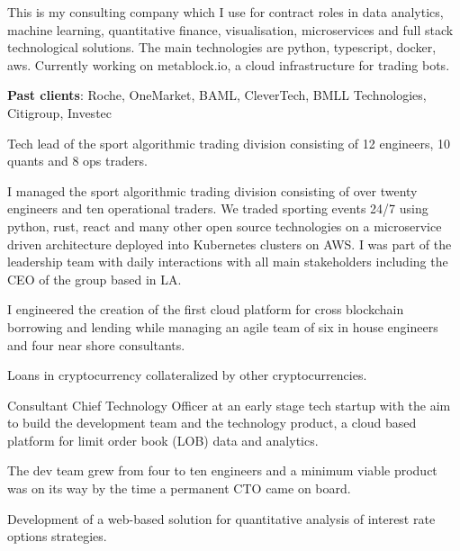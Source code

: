
This is my consulting company which I use for contract roles in data analytics, machine learning, quantitative finance,
visualisation, microservices and full stack technological solutions. The main technologies are python, typescript, docker, aws.
Currently working on \textcolor{sectcol}{metablock.io}, a cloud infrastructure for trading bots.

{\bf Past clients}: Roche, OneMarket, BAML, CleverTech, BMLL Technologies, Citigroup, Investec



Tech lead of the sport algorithmic trading division consisting of 12 engineers, 10 quants and 8 ops traders.

I managed the sport algorithmic trading division consisting of over twenty engineers and ten operational traders.
We traded sporting events 24/7 using python, rust, react and many other open source technologies on a
microservice driven architecture deployed into Kubernetes clusters on AWS.
I was part of the leadership team with daily interactions with all main stakeholders including
the CEO of the group based in LA.



I engineered the creation of the first cloud platform for cross blockchain borrowing and lending
while managing an agile team of six in house engineers and four near shore consultants.

Loans in cryptocurrency collateralized by other cryptocurrencies.



Consultant Chief Technology Officer at an early stage tech startup with the aim to build the development team and the technology product,
a cloud based platform for limit order book (LOB) data and analytics.

The dev team grew from four to ten engineers and a minimum viable product was on its way by the time a permanent CTO came on board.


Development of a web-based solution for quantitative analysis of interest rate options strategies.

